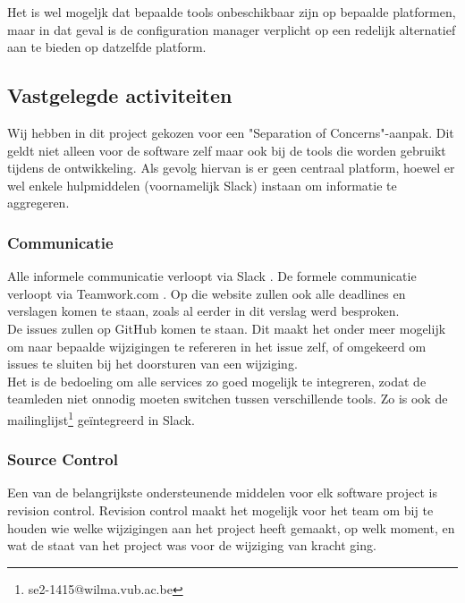 Het is wel mogeljk dat bepaalde tools onbeschikbaar zijn op bepaalde platformen, maar in dat geval is de configuration manager verplicht op een redelijk alternatief aan te bieden op datzelfde platform.

\subsection{Vastgelegde activiteiten}

Wij hebben in dit project gekozen voor een "Separation of Concerns"-aanpak. Dit geldt niet alleen voor de software zelf maar ook bij de tools die worden gebruikt tijdens de ontwikkeling. Als gevolg hiervan is er geen centraal platform, hoewel er wel enkele hulpmiddelen (voornamelijk Slack) instaan om informatie te aggregeren.

\subsubsection{Communicatie}

Alle informele communicatie verloopt via Slack \cite{Slack}. De formele communicatie verloopt via Teamwork.com \cite{Teamwork}. Op die website zullen ook alle deadlines en verslagen komen te staan, zoals al eerder in dit verslag werd besproken. \\

De issues zullen op GitHub \cite{GitHub} komen te staan. Dit maakt het onder meer mogelijk om naar bepaalde wijzigingen te refereren in het issue zelf, of omgekeerd om issues te sluiten bij het doorsturen van een wijziging. \\

Het is de bedoeling om alle services zo goed mogelijk te integreren, zodat de teamleden niet onnodig moeten switchen tussen verschillende tools. Zo is ook de mailinglijst\footnote{se2-1415@wilma.vub.ac.be} geïntegreerd in Slack.

\subsubsection{Source Control}

Een van de belangrijkste ondersteunende middelen voor elk software project is revision control. Revision control maakt het mogelijk voor het team om bij te houden wie welke wijzigingen aan het project heeft gemaakt, op welk moment, en wat de staat van het project was voor de wijziging van kracht ging. \\

